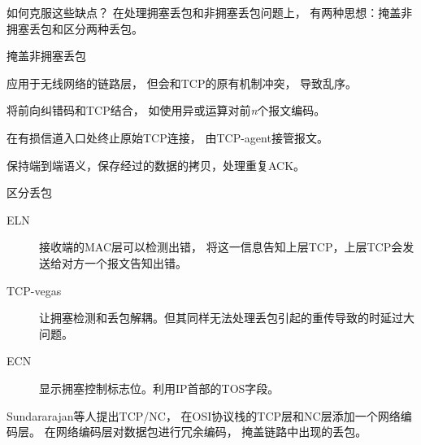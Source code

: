 \begin{frame}[t,allowframebreaks]{如何克服这些缺点？}
	在处理拥塞丢包和非拥塞丢包问题上，
	有两种思想：掩盖非拥塞丢包和区分两种丢包。
	\vspace{1em}
	\begin{block}{掩盖非拥塞丢包}
		\begin{description}
			\footnotesize
			\item[ARQ] 应用于无线网络的链路层，
			但会和TCP的原有机制冲突，
			导致乱序。
			\item[FEC] 将前向纠错码和TCP结合，
			如使用异或运算对前\emph{n}个报文编码。
			\item[Indirect-TCP] 在有损信道入口处终止原始TCP连接，
			由TCP-agent接管报文。
			\item[TCP-snoop] 保持端到端语义，保存经过的数据的拷贝，处理重复ACK。
		\end{description}
	\end{block}
	\begin{block}{区分丢包}
		\footnotesize
		\begin{description}
			\item[ELN] 接收端的MAC层可以检测出错，
			将这一信息告知上层TCP，上层TCP会发送给对方一个报文告知出错。
			\item[TCP-vegas] 让拥塞检测和丢包解耦。但其同样无法处理丢包引起的重传导致的时延过大问题。
			\item[ECN] 显示拥塞控制标志位。利用IP首部的TOS字段。
		\end{description}
	\end{block}
	Sundararajan等人提出TCP/NC，
	在OSI协议栈的TCP层和NC层添加一个网络编码层。
	在网络编码层对数据包进行冗余编码，
	掩盖链路中出现的丢包。
\end{frame}
